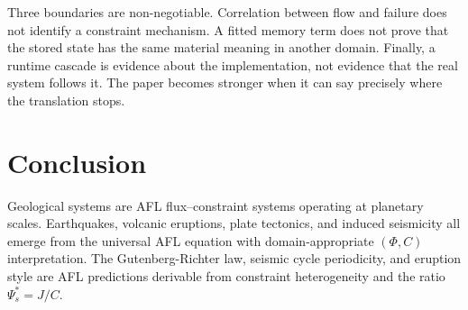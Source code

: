 \documentclass[11pt]{article}
\begin{document}
Three boundaries are non-negotiable. Correlation between flow and failure does
not identify a constraint mechanism. A fitted memory term does not prove that
the stored state has the same material meaning in another domain. Finally, a
runtime cascade is evidence about the implementation, not evidence that the
real system follows it. The paper becomes stronger when it can say precisely
where the translation stops.



\section{Conclusion}

Geological systems are AFL flux--constraint systems operating at planetary scales. Earthquakes,
volcanic eruptions, plate tectonics, and induced seismicity all emerge from the universal AFL
equation with domain-appropriate $(\Phi, C)$ interpretation. The Gutenberg-Richter law, seismic
cycle periodicity, and eruption style are AFL predictions derivable from constraint heterogeneity
and the ratio $\Psi_s^* = J/C$.



\end{document}
